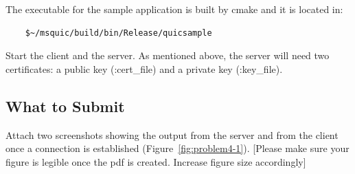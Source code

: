 \documentclass[11pt]{article}
\begin{document}
The executable for the sample application is built by cmake and it is located in:

\begin{verbatim}
    $~/msquic/build/bin/Release/quicsample
\end{verbatim}

Start the client and the server. As mentioned above, the server will need two certificates: a public key (:cert\_file) and a private key (:key\_file).

\subsection{What to Submit}


Attach two screenshots showing the output from the server and from the client once a connection is established (Figure~\ref{fig:problem4-1}). [Please make sure your figure is legible once the pdf is created. Increase figure size accordingly]
\end{document}
